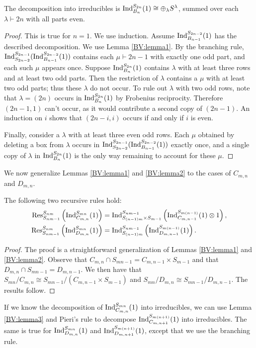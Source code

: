 \begin{theorem}\label{BV:theorem1}
The decomposition into irreducibles is 
$\textup{Ind}_{B_n}^{S_{2n}}(1) \cong \oplus_\lambda S^\lambda$, summed over each $\lambda \vdash 2n$ with all parts even.
\end{theorem}
\begin{proof}
This is true for $n=1$. We use induction. Assume $\textup{Ind}_{B_{n-1}}^{S_{2n-2}}(1)$ has the described decomposition. We use Lemma \ref{BV:lemma1}. By the branching rule, $\textup{Ind}^{S_{2n-1}}_{S_{2n-2}}(\textup{Ind}_{B_{n-1}}^{S_{2n-2}}(1))$ contains each $\mu \vdash 2n-1$ with exactly one odd part, and each such $\mu$ appears once. Suppose $\textup{Ind}_{B_n}^{S_{2n}}(1)$ contains $\lambda$ with at least three rows and at least two odd parts. Then the restriction of $\lambda$ contains a $\mu$ with at least two odd parts; thus these $\lambda$ do not occur. To rule out $\lambda$ with two odd rows, note that $\lambda=(2n)$ occurs in $\textup{Ind}_{B_n}^{S_{2n}}(1)$ by Frobenius reciprocity. Therefore $(2n-1,1)$ can't occur, as it would contribute a second copy of $(2n-1)$. An induction on $i$ shows that $(2n-i,i)$ occurs if and only if $i$ is even.

Finally, consider a $\lambda$ with at least three even odd rows. Each $\mu$ obtained by deleting a box from $\lambda$ occurs in $\textup{Ind}^{S_{2n-1}}_{S_{2n-2}}(\textup{Ind}_{B_{n-1}}^{S_{2n-2}}(1))$ exactly once, and a single copy of $\lambda$ in $\textup{Ind}_{B_n}^{S_{2n}}(1)$ is the only way remaining to account for these $\mu$.
\end{proof}

We now generalize Lemmas \ref{BV:lemma1} and \ref{BV:lemma2} to the cases of $C_{m,n}$ and $D_{m,n}$.

\begin{lemma}\label{BV:lemma3}
The following two recursive rules hold:
\begin{align*}
\textup{Res}_{S_{nm-1}}^{S_{nm}}\left(\textup{Ind}_{C_{m,n}}^{S_{mn}}(1)\right) &= \textup{Ind}_{S_{(n-1)m} \times S_{m-1}}^{S_{nm-1}}\left(\textup{Ind}_{C_{m,n-1}}^{S_{m(n-1)}}(1) \otimes 1\right), \\
\textup{Res}_{S_{nm-1}}^{S_{nm}}\left(\textup{Ind}_{D_{m,n}}^{S_{mn}}(1)\right) &= \textup{Ind}_{S_{(n-1)m} }^{S_{nm-1}}\left(\textup{Ind}_{D_{m,n-1}}^{S_{m(n-1)}}(1)\right).
\end{align*}
\end{lemma}
\begin{proof}
The proof is a straightforward generalization of Lemmas \ref{BV:lemma1} and \ref{BV:lemma2}.
Observe that $C_{m,n} \cap S_{mn-1} = C_{m,n-1} \times S_{m-1}$ and that $D_{m,n} \cap S_{mn-1} = D_{m,n-1}$.
We then have that $S_{mn} / C_{m,n} \cong S_{mn-1} / (C_{m,n-1} \times S_{m-1})$ and 
$S_{mn} / D_{m,n} \cong S_{mn-1} / D_{m,n-1}$. The results follow.
\end{proof}
If we know the decomposition of $\textup{Ind}_{C_{m,n}}^{S_{mn}}(1)$ into irreducibles, we can use Lemma \ref{BV:lemma3} and Pieri's rule to decompose $\textup{Ind}_{C_{m,n+1}}^{S_{m(n+1)}}(1)$ into irreducibles. The same is true for $\textup{Ind}_{D_{m,n}}^{S_{mn}}(1)$ and $\textup{Ind}_{D_{m,n+1}}^{S_{m(n+1)}}(1)$, except that we use the branching rule.


